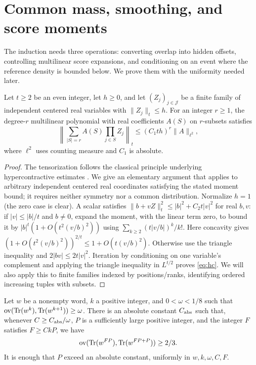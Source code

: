 \section{Common mass, smoothing, and score moments}\label{sec:tools}
The induction needs three operations: converting overlap into hidden offsets, controlling multilinear score expansions, and conditioning on an event where the reference density is bounded below.  We prove them with the uniformity needed later.

\begin{lemma}\label{lem:moment}
Let $t\ge2$ be an even integer, let $h\ge0$, and let $(Z_j)_{j\in\mathcal J}$ be a finite family of independent centered real variables with $\|Z_j\|_t\le h$.  For an integer $r\ge1$, the degree-$r$ multilinear
polynomial with real coefficients $A(S)$ on $r$-subsets satisfies
\begin{equation}\label{eq:hc}
\left\|\sum_{|S|=r} A(S)\prod_{j\in S}Z_j\right\|_t
\le (C_1 t h)^r \|A\|_{\ell^2},
\end{equation}
where $\ell^2$ uses counting measure and $C_1$ is absolute.
\end{lemma}

\begin{proof}
The tensorization follows the classical principle underlying hypercontractive estimates \citep{Bonami1970}.  We give an elementary argument that applies to arbitrary independent centered real coordinates satisfying the stated moment bound; it requires neither symmetry nor a common distribution.  Normalize $h=1$ (the zero case is clear). A scalar satisfies
$\|b+vZ\|_t^2\le |b|^2+C_2 t |v|^2$ for real $b,v$:
if $|v|\le |b|/t$ and $b\ne0$, expand the moment, with the linear
term zero, to bound it by $|b|^t(1+O(t^2(v/b)^2))$
using $\sum_{k\ge2}(t|v/b|)^k/k!$. Here concavity gives $(1+O(t^2(v/b)^2))^{2/t}\le
1+O(t(v/b)^2)$. Otherwise use the triangle inequality and $2|bv|\le 2t |v|^2$. Iteration by conditioning
on one variable's complement and applying the triangle inequality
in $L^{t/2}$ proves \eqref{eq:hc}. We will also apply this to finite
families indexed by positions/ranks, identifying ordered increasing
tuples with subsets.

\end{proof}

\begin{lemma}\label{lem:lift}
Let $w$ be a nonempty word, $k$ a positive integer, and $0<\omega<1/8$ such that $\operatorname{ov}(\mathrm{Tr}(w^k),\mathrm{Tr}(w^{k+1}))\ge\omega$.  There is an absolute constant $C_{\rm abs}$ such that, whenever $C\ge C_{\rm abs}/\omega$, $P$ is a sufficiently large positive integer, and the integer $F$ satisfies $F\ge CkP$, we have
\begin{equation}\label{eq:lift}
\operatorname{ov}(\mathrm{Tr}(w^{FP}),\mathrm{Tr}(w^{FP+P}))\ge 2/3.
\end{equation}
It is enough that $P$ exceed an absolute constant, uniformly in $w,k,\omega,C,F$.
\end{lemma}

